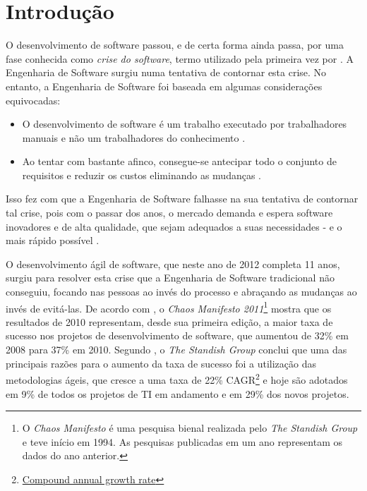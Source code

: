 \chapter{Introdução}

O desenvolvimento de software passou, e de certa forma ainda passa, por uma fase conhecida como \emph{crise do software}, termo utilizado pela primeira vez por . A Engenharia de Software surgiu \cite{NaurRandell} numa tentativa de contornar esta crise. No entanto, a Engenharia de Software foi baseada em algumas considerações equivocadas:

\begin{itemize}
\item
O desenvolvimento de software é um trabalho executado por trabalhadores manuais e não um trabalhadores do conhecimento \cite[38]{XPTeles}.

\item
Ao tentar com bastante afinco, consegue-se antecipar todo o conjunto de requisitos e reduzir os custos eliminando as mudanças \cite{TheBusinessOfInnovation}.
\end{itemize}

Isso fez com que a Engenharia de Software falhasse na sua tentativa de contornar tal crise, pois com o passar dos anos, o mercado demanda e espera software inovadores e de alta qualidade, que sejam adequados a suas necessidades - e o mais rápido possível \cite{TheBusinessOfInnovation}.

O desenvolvimento ágil de software, que neste ano de 2012 completa 11 anos, surgiu \cite{AgileManifesto} para resolver esta crise que a Engenharia de Software tradicional não conseguiu, focando nas pessoas ao invés do processo e abraçando as mudanças ao invés de evitá-las. De acordo com , o \textit{Chaos Manifesto 2011}\footnote{O \textit{Chaos Manifesto} é uma pesquisa bienal realizada pelo \textit{The Standish Group} e teve início em 1994. As pesquisas publicadas em um ano representam os dados do ano anterior.} mostra que os resultados de 2010 representam, desde sua primeira edição, a maior taxa de sucesso nos projetos de desenvolvimento de software, que aumentou de 32\% em 2008 para 37\% em 2010. Segundo , o \textit{The Standish Group} conclui que uma das principais razões para o aumento da taxa de sucesso foi a utilização das metodologias ágeis, que cresce a uma taxa de 22\% CAGR\footnote{\href{http://en.wikipedia.org/wiki/Compound_annual_growth_rate} {Compound annual growth rate}} e hoje são adotados em 9\% de todos os projetos de TI em andamento e em 29\% dos novos projetos.

